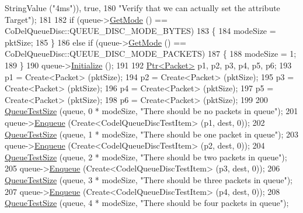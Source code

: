 \begin{DoxyCode}
      StringValue (\textcolor{stringliteral}{"4ms"})), \textcolor{keyword}{true},
180                          \textcolor{stringliteral}{"Verify that we can actually set the attribute Target"});
181 
182   \textcolor{keywordflow}{if} (queue->\hyperlink{classns3_1_1CoDelQueueDisc_ab4e1b3733d0961c823b6fa7d2e36c0bb}{GetMode} () == CoDelQueueDisc::QUEUE\_DISC\_MODE\_BYTES)
183     \{
184       modeSize = pktSize;
185     \}
186   \textcolor{keywordflow}{else} \textcolor{keywordflow}{if} (queue->\hyperlink{classns3_1_1CoDelQueueDisc_ab4e1b3733d0961c823b6fa7d2e36c0bb}{GetMode} () == CoDelQueueDisc::QUEUE\_DISC\_MODE\_PACKETS)
187     \{
188       modeSize = 1;
189     \}
190   queue->\hyperlink{classns3_1_1Object_af4411cb29971772fcd09203474a95078}{Initialize} ();
191 
192   \hyperlink{classns3_1_1Ptr}{Ptr<Packet>} p1, p2, p3, p4, p5, p6;
193   p1 = Create<Packet> (pktSize);
194   p2 = Create<Packet> (pktSize);
195   p3 = Create<Packet> (pktSize);
196   p4 = Create<Packet> (pktSize);
197   p5 = Create<Packet> (pktSize);
198   p6 = Create<Packet> (pktSize);
199 
200   \hyperlink{classCoDelQueueDiscBasicEnqueueDequeue_abd4b321f709f67998f635c2f6567b993}{QueueTestSize} (queue, 0 * modeSize, \textcolor{stringliteral}{"There should be no packets in queue"});
201   queue->\hyperlink{classns3_1_1QueueDisc_af452fb01b98fed312125163f1fe85431}{Enqueue} (Create<CodelQueueDiscTestItem> (p1, dest, 0));
202   \hyperlink{classCoDelQueueDiscBasicEnqueueDequeue_abd4b321f709f67998f635c2f6567b993}{QueueTestSize} (queue, 1 * modeSize, \textcolor{stringliteral}{"There should be one packet in queue"});
203   queue->\hyperlink{classns3_1_1QueueDisc_af452fb01b98fed312125163f1fe85431}{Enqueue} (Create<CodelQueueDiscTestItem> (p2, dest, 0));
204   \hyperlink{classCoDelQueueDiscBasicEnqueueDequeue_abd4b321f709f67998f635c2f6567b993}{QueueTestSize} (queue, 2 * modeSize, \textcolor{stringliteral}{"There should be two packets in queue"});
205   queue->\hyperlink{classns3_1_1QueueDisc_af452fb01b98fed312125163f1fe85431}{Enqueue} (Create<CodelQueueDiscTestItem> (p3, dest, 0));
206   \hyperlink{classCoDelQueueDiscBasicEnqueueDequeue_abd4b321f709f67998f635c2f6567b993}{QueueTestSize} (queue, 3 * modeSize, \textcolor{stringliteral}{"There should be three packets in queue"});
207   queue->\hyperlink{classns3_1_1QueueDisc_af452fb01b98fed312125163f1fe85431}{Enqueue} (Create<CodelQueueDiscTestItem> (p4, dest, 0));
208   \hyperlink{classCoDelQueueDiscBasicEnqueueDequeue_abd4b321f709f67998f635c2f6567b993}{QueueTestSize} (queue, 4 * modeSize, \textcolor{stringliteral}{"There should be four packets in queue"});

\end{DoxyCode}
